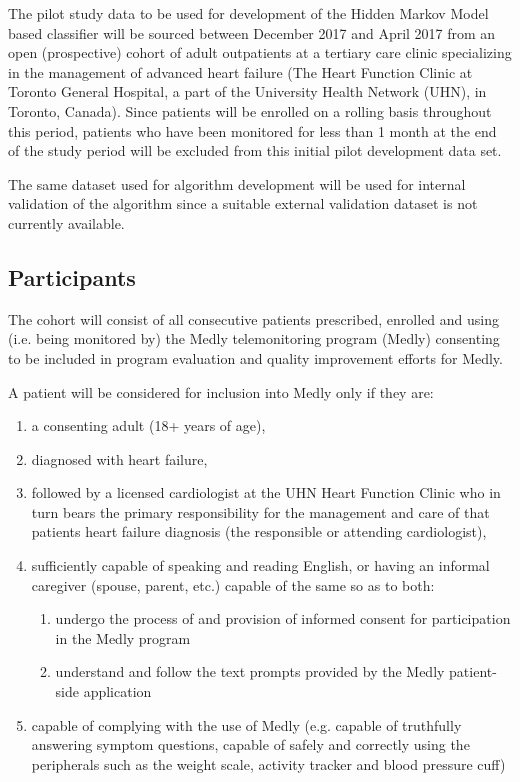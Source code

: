 \documentclass[]{article}
\begin{document}
The pilot study data to be used for development of the Hidden Markov Model based classifier will be sourced between December 2017 and April 2017 from an open (prospective) cohort of adult outpatients at a tertiary care clinic specializing in the management of advanced heart failure (The Heart Function Clinic at Toronto General Hospital, a part of the University Health Network (UHN), in Toronto, Canada). Since patients will be enrolled on a rolling basis throughout this period, patients who have been monitored for less than 1 month at the end of the study period will be excluded from this initial pilot development data set.

The same dataset used for algorithm development will be used for internal validation of the algorithm since a suitable external validation dataset is not currently available.


\subsection{Participants} %

The cohort will consist of all consecutive patients prescribed, enrolled and using (i.e. being monitored by) the Medly telemonitoring program (Medly) consenting to be included in program evaluation and quality improvement efforts for Medly.

A patient will be considered for inclusion into Medly only if they are:
\begin{enumerate}
	\item a consenting adult (18+ years of age), 
	\item diagnosed with heart failure,
	\item followed by a licensed cardiologist at the UHN Heart Function Clinic who in turn bears the primary responsibility for the management and care of that patients heart failure diagnosis (the responsible or attending cardiologist),
	\item sufficiently capable of speaking and reading English, or having an informal caregiver (spouse, parent, etc.) capable of the same so as to both: 
	\begin{enumerate}
		\item undergo the process of and provision of informed consent for participation in the Medly program
		\item understand and follow the text prompts provided by the Medly patient-side application
	\end{enumerate}
	\item capable of complying with the use of Medly (e.g. capable of truthfully answering symptom questions, capable of safely and correctly using the peripherals such as the weight scale, activity tracker and blood pressure cuff)
\end{enumerate}
\end{document}
